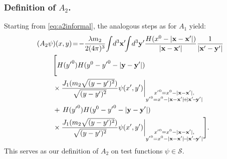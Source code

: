 \documentclass[b5paper,draft,openbib,12pt]{memoir}
\newcommand{\vx}{\mathbf{x}}
\newcommand{\vy}{\mathbf{y}}
\begin{document}
\subsubsection{Definition of $A_2$.} Starting from 
\eqref{eq:a2informal}, the analogous steps as for $A_1$ yield:
\begin{align}
	(A_2 \psi&)(x,y) \!=\!  -\frac{\lambda  m_2}{2(4 \pi)^3}\! \int \!d^3 \vx' \!\!\int\! d^3 \vy'\frac{H(x^0-|\vx-\vx'|)}{|\vx-\vx'|} \frac{1}{|\vx'-\vy'|} \nonumber\\
&\Bigg[ H({y'}^0)H(y^0-{y'}^0-|\vy-\vy'|)  \notag\\
&\times \frac{J_1(m_2\sqrt{(y-y')^2})}{\sqrt{(y-y')^2}} \psi(x',y')\bigg|_{\substack{{x'}^0 = x^0-|\vx-\vx'|,\\{y'}^0 = x^0 - |\vx-\vx'| \!+\! |\vx'\!-\!\vy'| }}\nonumber\\
&+ \, H({y'}^0)H(y^0-{y'}^0-|\vy-\vy'|)   \notag\\
&\times \frac{J_1(m_2\sqrt{(y-y')^2})}{\sqrt{(y-y')^2}} \psi(x',y')\bigg|_{\substack{{x'}^0 = x^0-|\vx-\vx'|,\\{y'}^0 = x^0 - |\vx-\vx'| \!-\! |\vx'\!-\!\vy'| }} \Bigg] .\label{eq:defa2}
\end{align}
This serves as our definition of $A_2$ on test functions $\psi \in \mathcal{S}$.

\end{document}

